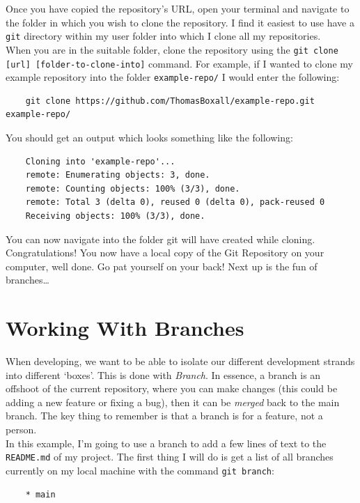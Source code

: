 \documentclass[a4paper, 11pt]{article}
\begin{document}
Once you have copied the repository's URL, open your terminal and navigate to the folder in which you wish to clone the repository. I find it easiest to use have a \verb|git| directory within my user folder into which I clone all my repositories.\\

When you are in the suitable folder, clone the repository using the \verb|git clone [url] [folder-to-clone-into]| command. For example, if I wanted to clone my example repository into the folder \verb|example-repo/| I would enter the following:
\begin{verbatim}
    git clone https://github.com/ThomasBoxall/example-repo.git example-repo/
\end{verbatim}

You should get an output which looks something like the following:
\begin{verbatim}
    Cloning into 'example-repo'...
    remote: Enumerating objects: 3, done.
    remote: Counting objects: 100% (3/3), done.
    remote: Total 3 (delta 0), reused 0 (delta 0), pack-reused 0
    Receiving objects: 100% (3/3), done.
\end{verbatim}

You can now navigate into the folder git will have created while cloning.\\

Congratulations! You now have a local copy of the Git Repository on your computer, well done. Go pat yourself on your back! Next up is the fun of branches\dots

\section{Working With Branches}
When developing, we want to be able to isolate our different development strands into different `boxes'. This is done with \textit{Branch}. In essence, a branch is an offshoot of the current repository, where you can make changes (this could be adding a new feature or fixing a bug), then it can be \textit{merged} back to the main branch. The key thing to remember is that a branch is for a feature, not a person.\\

In this example, I'm going to use a branch to add a few lines of text to the \verb|README.md| of my project. The first thing I will do is get a list of all branches currently on my local machine with the command \verb|git branch|:
\begin{verbatim}
    * main
\end{verbatim}
\end{document}
